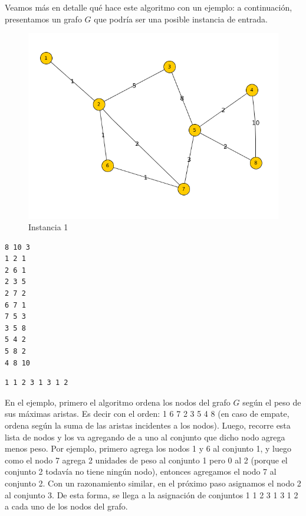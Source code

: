 \documentclass[11pt, a4paper, twoside]{article}
\begin{document}
\begin{enumerate}
		Veamos más en detalle qué hace este algoritmo con un ejemplo: a continuación, presentamos un grafo $G$ 
		que podría ser una posible instancia de entrada.
		\begin{figure}[H]
		\includegraphics[scale=1]{imagenes/ej2.png}
		\caption{Instancia 1}
		\end{figure}
		
\begin{minipage}[t]{0.4\textwidth}
\begin{Verbatim}[frame=single,framesep=1cm,label= Ejemplo de entrada: instancia 1]
8 10 3
1 2 1
2 6 1
2 3 5
2 7 2
6 7 1
7 5 3
3 5 8
5 4 2
5 8 2
4 8 10
\end{Verbatim}
\end{minipage}
\hfill
\begin{minipage}[t]{0.4\textwidth}
\begin{Verbatim}[frame=single,framesep=1cm,label= Ejemplo de salida: instancia 1]
1 1 2 3 1 3 1 2
\end{Verbatim}
\end{minipage}
		
		En el ejemplo, primero el algoritmo ordena los nodos del grafo $G$ según el peso de sus máximas
		aristas. Es decir con el orden: 1 6 7 2 3 5 4 8 (en caso de empate, ordena según la suma de las aristas
		incidentes a los nodos). Luego, recorre esta lista de nodos y los va agregando de a uno al conjunto que
		dicho nodo agrega menos peso. Por ejemplo, primero agrega los nodos 1 y 6 al conjunto 1, y luego como el
		nodo 7 agrega 2 unidades de peso al conjunto 1 pero 0 al 2 (porque el conjunto 2 todavía no tiene ningún
		nodo), entonces agregamos el nodo 7 al conjunto 2. Con un razonamiento similar, en el próximo paso asignamos
		el nodo 2 al conjunto 3. De esta forma, se llega a la asignación de conjuntos 1 1 2 3 1 3 1 2 a cada uno de
		los nodos del grafo.
		

\end{enumerate}
\end{document}
